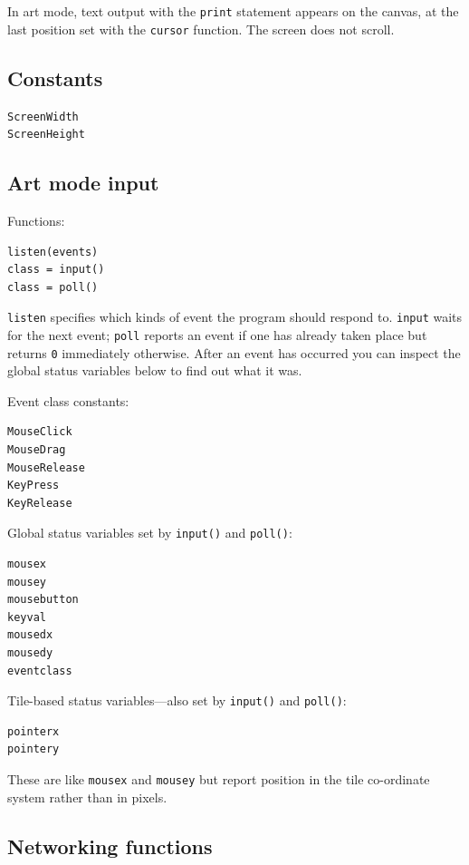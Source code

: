 \documentclass[12pt,a4paper,twoside]{article}
\renewcommand{\_}{\texttt{\symbol{95}}}
\begin{document}
In art mode, text output with the \verb^print^ statement appears on the
canvas, at the last position set with the \verb^cursor^ function.
The screen does not scroll.

\subsection{Constants}

\begin{verbatim}
ScreenWidth
ScreenHeight
\end{verbatim}

\subsection{Art mode input}

Functions:

\begin{verbatim}
listen(events)
class = input()
class = poll()
\end{verbatim}

\verb^listen^ specifies which kinds of event the program should respond to.
\verb^input^ waits for the next event; \verb^poll^ reports an event
if one has already taken place but returns \verb^0^ immediately otherwise.
After an event has occurred you can inspect the global status variables
below to find out what it was.

Event class constants:

\begin{verbatim}
MouseClick
MouseDrag
MouseRelease
KeyPress
KeyRelease
\end{verbatim}

Global status variables set by \verb^input()^ and \verb^poll()^:

\begin{verbatim}
mousex
mousey
mousebutton
keyval
mousedx
mousedy
eventclass
\end{verbatim}

Tile-based status variables---also set by \verb^input()^ and \verb^poll()^:

\begin{verbatim}
pointerx
pointery
\end{verbatim}

These are like \verb^mousex^ and \verb^mousey^ but report position in
the tile co-ordinate system rather than in pixels.

\subsection{Networking functions} \label{sec:networking-functions}
\end{document}
